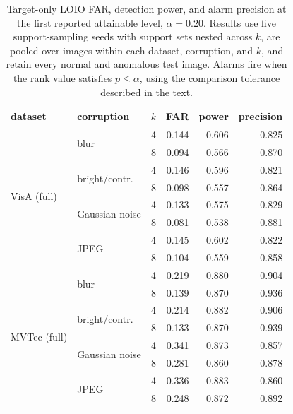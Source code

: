 \begin{table}[pos=t]
\centering
\caption{Target-only LOIO FAR, detection power, and alarm precision at the first reported attainable level, $\alpha{=}0.20$. Results use five support-sampling seeds with support sets nested across $k$, are pooled over images within each dataset, corruption, and $k$, and retain every normal and anomalous test image. Alarms fire when the rank value satisfies $p\le\alpha$, using the comparison tolerance described in the text.}
\label{tab:false-alarm-control}
\footnotesize
\setlength{\tabcolsep}{3pt}
\begin{tabular}{llrrrr}
\toprule
dataset & corruption & $k$ & FAR & power & precision \\
\midrule
\multirow{8}{*}{VisA (full)} & \multirow{2}{*}{blur} & 4 & 0.144 & 0.606 & 0.825 \\
 & & 8 & 0.094 & 0.566 & 0.870 \\
\cmidrule(lr){2-6}
 & \multirow{2}{*}{bright/contr.} & 4 & 0.146 & 0.596 & 0.821 \\
 & & 8 & 0.098 & 0.557 & 0.864 \\
\cmidrule(lr){2-6}
 & \multirow{2}{*}{Gaussian noise} & 4 & 0.133 & 0.575 & 0.829 \\
 & & 8 & 0.081 & 0.538 & 0.881 \\
\cmidrule(lr){2-6}
 & \multirow{2}{*}{JPEG} & 4 & 0.145 & 0.602 & 0.822 \\
 & & 8 & 0.104 & 0.559 & 0.858 \\
\midrule
\multirow{8}{*}{MVTec (full)} & \multirow{2}{*}{blur} & 4 & 0.219 & 0.880 & 0.904 \\
 & & 8 & 0.139 & 0.870 & 0.936 \\
\cmidrule(lr){2-6}
 & \multirow{2}{*}{bright/contr.} & 4 & 0.214 & 0.882 & 0.906 \\
 & & 8 & 0.133 & 0.870 & 0.939 \\
\cmidrule(lr){2-6}
 & \multirow{2}{*}{Gaussian noise} & 4 & 0.341 & 0.873 & 0.857 \\
 & & 8 & 0.281 & 0.860 & 0.878 \\
\cmidrule(lr){2-6}
 & \multirow{2}{*}{JPEG} & 4 & 0.336 & 0.883 & 0.860 \\
 & & 8 & 0.248 & 0.872 & 0.892 \\
\bottomrule
\end{tabular}
\end{table}
